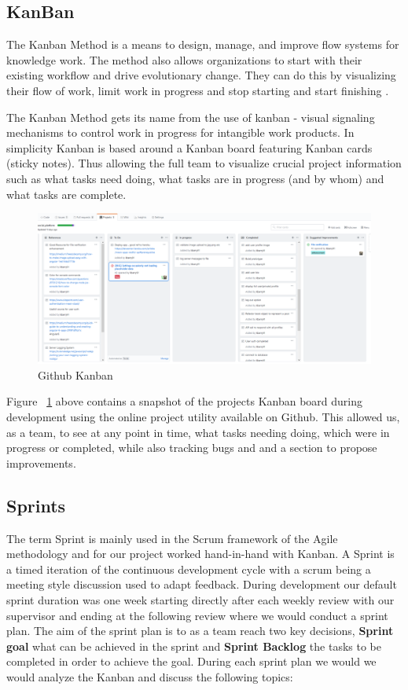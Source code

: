 \subsection{KanBan} \label{KanbanSection}
The Kanban Method is a means to design, manage, and improve flow systems for knowledge work. The method also allows organizations to start with their existing workflow and drive evolutionary change. They can do this by visualizing their flow of work, limit work in progress and stop starting and start finishing \cite{kanban}.

The Kanban Method gets its name from the use of kanban - visual signaling mechanisms to control work in progress for intangible work products. In simplicity Kanban is based around a Kanban board featuring Kanban cards (sticky notes). Thus allowing the full team to visualize crucial project information such as what tasks need doing, what tasks are in progress (and by whom) and what tasks are complete. 

\begin{figure}[H]
  \includegraphics[width=\linewidth]{img/kanban.PNG}
  \caption{Github Kanban}
  \label{fig:kanban}
\end{figure}

Figure  ~\ref{fig:kanban} above contains a snapshot of the projects Kanban board during development using the online project utility available on Github. This allowed us, as a team, to see at any point in time, what tasks needing doing, which were in progress or completed, while also tracking bugs and and a section to propose improvements.

\subsection{Sprints}
The term Sprint is mainly used in the Scrum framework of the Agile methodology and for our project worked hand-in-hand with Kanban. A Sprint is a timed iteration of the continuous development cycle with a scrum being a meeting style discussion used to adapt feedback. During development our default sprint duration was one week starting directly after each weekly review with our supervisor and ending at the following review where we would conduct a sprint plan. The aim of the sprint plan is to as a team reach two key decisions, \textbf{Sprint goal} what can be achieved in the sprint and \textbf{Sprint Backlog} the tasks to be completed in order to achieve the goal. During each sprint plan we would we would analyze the Kanban and discuss the following topics:

